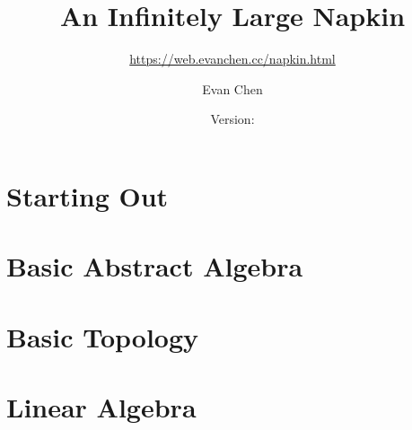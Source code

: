 \documentclass[11pt,a5paper,twoside=semi,openright,numbers=noenddot,titlepage=false]{scrbook}
\title{An Infinitely Large Napkin}
\subtitle{\url{https://web.evanchen.cc/napkin.html}}
\author{Evan Chen}
\date{Version: \napkinversion}
\begin{document}
\frontmatter
\maketitle

\bgroup
\fboxrule=4pt
\noindent{}
\egroup
\newpage




\setcounter{chapter}{-1} %


\cleardoublepage
{}
\setcounter{temppage}{\value{page}}
\mainmatter
\setcounter{page}{\value{temppage}}

\tableofcontents


\part{Starting Out}
\label{part:startout}
\parttoc
\setcounter{chapter}{-1} %




\part{Basic Abstract Algebra}
\label{part:absalg}
\parttoc




\part{Basic Topology}
\label{part:basictop}
\parttoc




\part{Linear Algebra}
\label{part:linalg}
\parttoc







\end{document}
